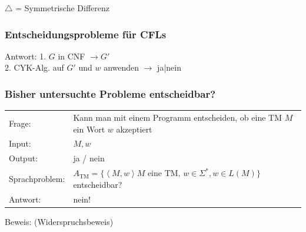 $\bigtriangleup$ = Symmetrische Differenz

\subsubsection{Entscheidungsprobleme für CFLs}


Antwort: 1. $G$ in CNF $\rightarrow G'$ \\
		 2. CYK-Alg. auf $G'$ und $w$ anwenden $\rightarrow$ ja|nein



\subsubsection{Bisher untersuchte Probleme entscheidbar?}

\begin{tabu}{l X}
	Frage: &Kann man mit einem Programm entscheiden, ob eine TM $M$ ein Wort $w$ akzeptiert \\
	Input: &$M, w$\\
	Output: &ja / nein\\
	Sprachproblem: & $A_\text{TM}=\{\left<M,w\right>  M \text{ eine TM, } w \in \Sigma^\ast, w \in L(M) \}$ entscheidbar?\\
	Antwort: &nein!
\end{tabu}

Beweis: (Widerspruchsbeweis)

